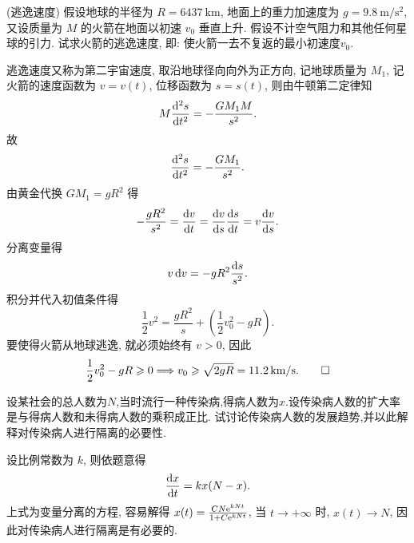 \begin{exercise}(逃逸速度)
  假设地球的半径为 $R=\qty{6437}{\kilo\metre}$,
  地面上的重力加速度为 $g=\qty[per-mode=symbol]{9.8}{\meter\per\square\second}$,
  又设质量为 $M$ 的火箭在地面以初速 $v_0$ 垂直上升.
  假设不计空气阻力和其他任何星球的引力. 试求火箭的逃逸速度, 即: 使火箭一去不复返的最小初速度$v_0$.
\end{exercise}

\begin{solution}
逃逸速度又称为第二宇宙速度, 取沿地球径向向外为正方向, 记地球质量为 $M_1$,
记火箭的速度函数为 $v=v(t)$, 位移函数为 $s=s(t)$, 则由牛顿第二定律知
\[M\frac{\mathop{}\!\mathrm{d}^2s}{\mathop{}\!\mathrm{d} t^2}=-\frac{GM_1M}{s^2}.\]
故
\[\frac{\mathop{}\!\mathrm{d}^2s}{\mathop{}\!\mathrm{d} t^2}=-\frac{GM_1}{s^2}.\]
由黄金代换 $GM_1=gR^2$ 得
\[-\frac{gR^2}{s^2}=\frac{\diff v}{\diff t}=\frac{\diff v}{\diff s}\frac{\diff s}{\diff t}
  =v\frac{\diff v}{\diff s}.\]
分离变量得
\[v\mathop{}\!\mathrm{d} v=-gR^2\frac{\mathop{}\!\mathrm{d} s}{s^2}.\]
积分并代入初值条件得
\[\frac{1}{2}v^2=\frac{gR^2}{s}+\left(\frac{1}{2}v_0^2-gR\right).\]
要使得火箭从地球逃逸, 就必须始终有 $v>0$, 因此
\[\frac{1}{2}v_0^2-gR\geqslant 0
\Longrightarrow v_0\geqslant\sqrt{2gR}=\qty[per-mode=symbol]{11.2}{\kilo\meter\per\second}.\qedhere\]
\end{solution}



\begin{exercise}
  设某社会的总人数为$N$,当时流行一种传染病,得病人数为$x$.设传染病人数的扩大率是与得病人数和未得病人数的乘积成正比.
  试讨论传染病人数的发展趋势,并以此解释对传染病人进行隔离的必要性.
\end{exercise}

\begin{solution}
  设比例常数为 $k$, 则依题意得
  \[\frac{\mathop{}\!\mathrm{d} x}{\mathop{}\!\mathrm{d} t}=kx(N-x).\]
  上式为变量分离的方程, 容易解得 $x(t)=\frac{CN\mathrm{e}^{kNt}}{1+C\mathrm{e}^{kNt}}$,
  当 $t\to+\infty$ 时, $x(t)\to N$, 因此对传染病人进行隔离是有必要的.
\end{solution}